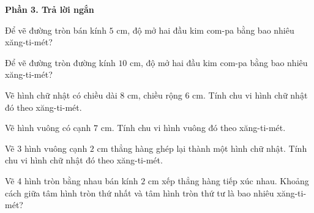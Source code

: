 \textbf{Phần 3. Trả lời ngắn}

\begin{ex} %
Để vẽ đường tròn bán kính $5\text{ cm}$, độ mở hai đầu kim com-pa bằng bao nhiêu xăng-ti-mét?
\end{ex}

\begin{ex} %
Để vẽ đường tròn đường kính $10\text{ cm}$, độ mở hai đầu kim com-pa bằng bao nhiêu xăng-ti-mét?
\end{ex}

\begin{ex} %
Vẽ hình chữ nhật có chiều dài $8\text{ cm}$, chiều rộng $6\text{ cm}$. Tính chu vi hình chữ nhật đó theo xăng-ti-mét.
\end{ex}

\begin{ex} %
Vẽ hình vuông có cạnh $7\text{ cm}$. Tính chu vi hình vuông đó theo xăng-ti-mét.
\end{ex}

\begin{ex} %
Vẽ 3 hình vuông cạnh $2\text{ cm}$ thẳng hàng ghép lại thành một hình chữ nhật. Tính chu vi hình chữ nhật đó theo xăng-ti-mét.
\end{ex}

\begin{ex} %
Vẽ 4 hình tròn bằng nhau bán kính $2\text{ cm}$ xếp thẳng hàng tiếp xúc nhau. Khoảng cách giữa tâm hình tròn thứ nhất và tâm hình tròn thứ tư là bao nhiêu xăng-ti-mét?
\end{ex}
